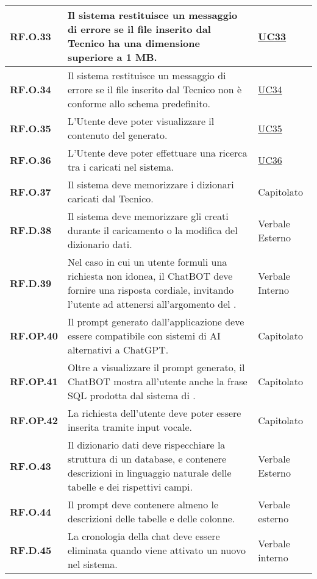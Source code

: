 \begin{longtable}{|P{3cm}|P{6,5cm}|>{\arraybackslash}P{4cm}|}
    \hline
    \textbf{RF.O.33} & Il sistema restituisce un messaggio di errore se il file inserito dal Tecnico ha una dimensione superiore a 1 MB. & \hyperref[UC33]{UC33} \\
    \hline
    \textbf{RF.O.34} & Il sistema restituisce un messaggio di errore se il file inserito dal Tecnico non è conforme allo schema predefinito. & \hyperref[UC34]{UC34} \\
    \hline
    \textbf{RF.O.35} & L'Utente deve poter visualizzare il contenuto del  generato. & \hyperref[UC35]{UC35} \\
    \hline
    \textbf{RF.O.36} & L'Utente deve poter effettuare una ricerca tra i  caricati nel sistema. & \hyperref[UC36]{UC36} \\
    \hline
    \textbf{RF.O.37} & Il sistema deve memorizzare i dizionari caricati dal Tecnico. & Capitolato \\
    \hline
    \textbf{RF.D.38} & Il sistema deve memorizzare gli  creati durante il caricamento o la modifica del dizionario dati. & Verbale Esterno\\
    \hline
    \textbf{RF.D.39} & Nel caso in cui un utente formuli una richiesta non idonea, il ChatBOT deve fornire una risposta cordiale, invitando l'utente ad attenersi all'argomento del . & Verbale Interno \\
    \hline
    \textbf{RF.OP.40} & Il prompt generato dall'applicazione deve essere compatibile con sistemi di AI alternativi a ChatGPT. & Capitolato \\
    \hline
    \textbf{RF.OP.41} & Oltre a visualizzare il prompt generato, il ChatBOT mostra all'utente anche la frase SQL prodotta dal sistema di . & Capitolato \\
    \hline
    \textbf{RF.OP.42} & La richiesta dell'utente deve poter essere inserita tramite input vocale. & Capitolato \\
    \hline
    \textbf{RF.O.43} & Il dizionario dati deve rispecchiare la struttura di un database, e contenere descrizioni in linguaggio naturale delle tabelle e dei rispettivi campi. & Verbale Esterno \\
    \hline
    \textbf{RF.O.44} & Il prompt deve contenere almeno le descrizioni delle tabelle e delle colonne. & Verbale esterno\\
    \hline
    \textbf{RF.D.45} & La cronologia della chat deve essere eliminata quando viene attivato un nuovo  nel sistema. & Verbale interno \\

\end{longtable}
